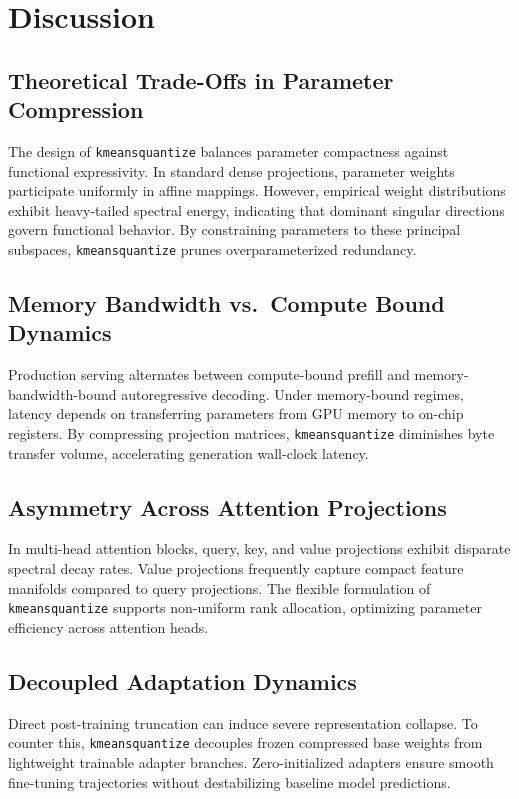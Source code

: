 \section{Discussion}

\subsection{Theoretical Trade-Offs in Parameter Compression}
The design of \texttt{kmeansquantize} balances parameter compactness against functional expressivity. In standard dense projections, parameter weights participate uniformly in affine mappings. However, empirical weight distributions exhibit heavy-tailed spectral energy, indicating that dominant singular directions govern functional behavior. By constraining parameters to these principal subspaces, \texttt{kmeansquantize} prunes overparameterized redundancy.

\subsection{Memory Bandwidth vs.\ Compute Bound Dynamics}
Production serving alternates between compute-bound prefill and memory-bandwidth-bound autoregressive decoding. Under memory-bound regimes, latency depends on transferring parameters from GPU memory to on-chip registers. By compressing projection matrices, \texttt{kmeansquantize} diminishes byte transfer volume, accelerating generation wall-clock latency.

\subsection{Asymmetry Across Attention Projections}
In multi-head attention blocks, query, key, and value projections exhibit disparate spectral decay rates. Value projections frequently capture compact feature manifolds compared to query projections. The flexible formulation of \texttt{kmeansquantize} supports non-uniform rank allocation, optimizing parameter efficiency across attention heads.

\subsection{Decoupled Adaptation Dynamics}
Direct post-training truncation can induce severe representation collapse. To counter this, \texttt{kmeansquantize} decouples frozen compressed base weights from lightweight trainable adapter branches. Zero-initialized adapters ensure smooth fine-tuning trajectories without destabilizing baseline model predictions.

